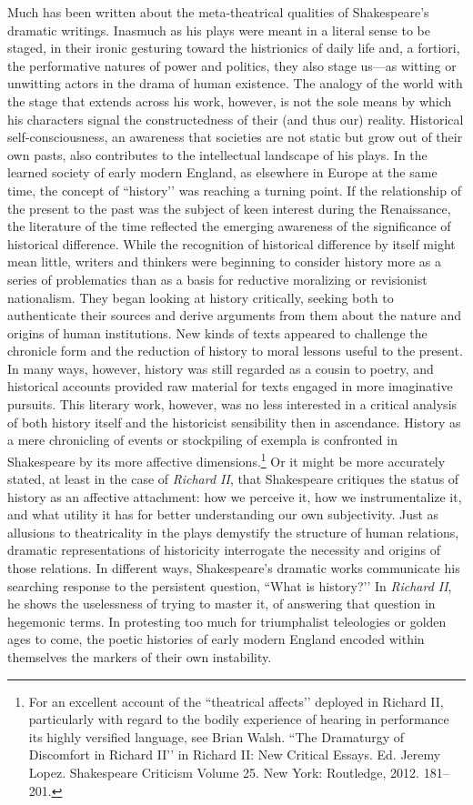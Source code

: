 Much has been written about the meta-theatrical qualities of Shakespeare’s dramatic writings.
Inasmuch as his plays were meant in a literal sense to be staged, in their ironic gesturing toward the histrionics of daily life and, a fortiori, the performative natures of power and politics, they also stage us---as witting or unwitting actors in the drama of human existence.
The analogy of the world with the stage that extends across his work, however, is not the sole means by which his characters signal the constructedness of their (and thus our) reality.
Historical self-consciousness, an awareness that societies are not static but grow out of their own pasts, also contributes to the intellectual landscape of his plays.
In the learned society of early modern England, as elsewhere in Europe at the same time, the concept of ``history’’ was reaching a turning point.
If the relationship of the present to the past was the subject of keen interest during the Renaissance, the literature of the time reflected the emerging awareness of the significance of historical difference.
While the recognition of historical difference by itself might mean little, writers and thinkers were beginning to consider history more as a series of problematics than as a basis for reductive moralizing or revisionist nationalism.
They began looking at history critically, seeking both to authenticate their sources and derive arguments from them about the nature and origins of human institutions.
New kinds of texts appeared to challenge the chronicle form and the reduction of history to moral lessons useful to the present.
In many ways, however, history was still regarded as a cousin to poetry, and historical accounts provided raw material for texts engaged in more imaginative pursuits.
This literary work, however, was no less interested in a critical analysis of both history itself and the historicist sensibility then in ascendance.
History as a mere chronicling of events or stockpiling of exempla is confronted in Shakespeare by its more affective dimensions.\footnote{For an excellent account of the ``theatrical affects’’ deployed in Richard II, particularly with regard to the bodily experience of hearing in performance its highly versified language, see Brian Walsh.
``The Dramaturgy of Discomfort in Richard II’’ in Richard II: New Critical Essays. Ed. Jeremy Lopez. Shakespeare Criticism Volume 25. New York: Routledge, 2012. 181--201.} Or it might be more accurately stated, at least in the case of \emph{Richard II}, that Shakespeare critiques the status of history as an affective attachment: how we perceive it, how we instrumentalize it, and what utility it has for better understanding our own subjectivity.
Just as allusions to theatricality in the plays demystify the structure of human relations, dramatic representations of historicity interrogate the necessity and origins of those relations.
In different ways, Shakespeare’s dramatic works communicate his searching response to the persistent question, ``What is history?’’ In \emph{Richard II}, he shows the uselessness of trying to master it, of answering that question in hegemonic terms.
In protesting too much for triumphalist teleologies or golden ages to come, the poetic histories of early modern England encoded within themselves the markers of their own instability.

